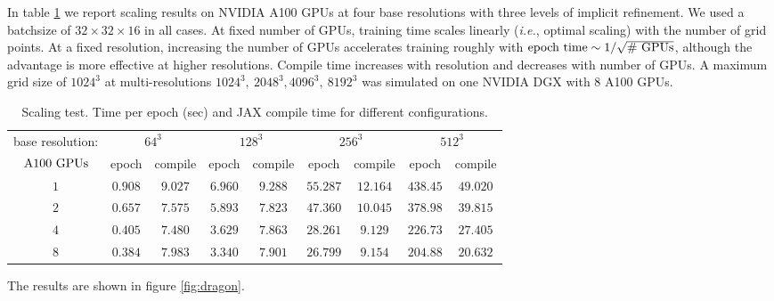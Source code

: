 \documentclass{elsarticle}
\begin{document}
In table \ref{tab:scaling} we report scaling results on NVIDIA A100 GPUs at four base resolutions with three levels of implicit refinement. We used a batchsize of $32\times 32\times 16$ in all cases. At fixed number of GPUs, training time scales linearly (\textit{i.e.}, optimal scaling) with the number of grid points. At a fixed resolution, increasing the number of GPUs accelerates training roughly with $\rm epoch\ time \sim 1/\sqrt{\text{\# }GPUs}$, although the advantage is more effective at higher resolutions. Compile time increases with resolution and decreases with number of GPUs. A maximum grid size of $1024^3$ at multi-resolutions $1024^3,\ 2048^3, 4096^3,\ 8192^3$ was simulated on one NVIDIA DGX with 8 A100 GPUs. 

\begin{table}[ht]
\begin{center}
\caption{Scaling test. Time per epoch (sec) and JAX compile time for different configurations.} \label{tab:scaling}
\begin{tabular}{ccccccccc}
\toprule
base resolution: & \multicolumn{2}{c}{$64^3$}& \multicolumn{2}{c}{$128^3$} & \multicolumn{2}{c}{$256^3$}  & \multicolumn{2}{c}{$512^3$}\\
\cmidrule(r){1-1}\cmidrule(r){2-3}\cmidrule(r){4-5}\cmidrule(r){6-7}\cmidrule(r){8-9}
$\rm A100\ GPUs$ &  epoch  &  compile   &  epoch   & compile &    epoch & compile  &  epoch    &   compile \\
\cmidrule(r){1-1}\cmidrule(r){2-3}\cmidrule(r){4-5}\cmidrule(r){6-7}\cmidrule(r){8-9} 
$1$        & $0.908$ &  $9.027$   & $6.960$  & $9.288$ & $55.287$ & $12.164$ &  $438.45$  &  $49.020$ \\
$2$        & $0.657$ &  $7.575$   & $5.893$  & $7.823$ & $47.360$ & $10.045$ &  $378.98$  &  $39.815$ \\ 
$4$        & $0.405$ &  $7.480$   & $3.629$  & $7.863$ & $28.261$ & $9.129$  &  $226.73$  &  $27.405$ \\ 
$8$        & $0.384$ &  $7.983$   & $3.340$  & $7.901$ & $26.799$ & $9.154$  &  $204.88$  &  $20.632$\\ \bottomrule
\end{tabular}
\end{center}
\end{table}







The results are shown in figure \ref{fig:dragon}.
\end{document}
